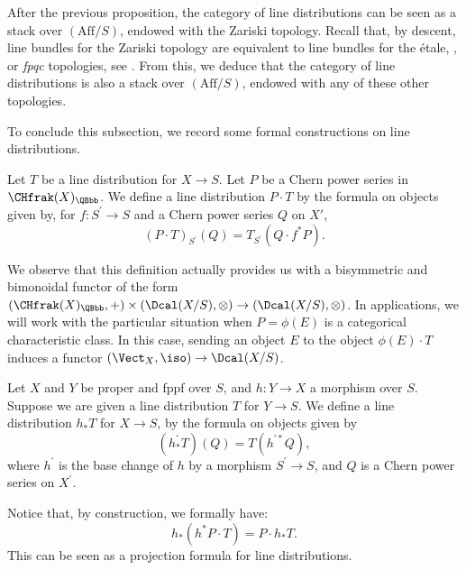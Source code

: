 \begin{remark}
After the previous proposition, the category of line distributions can be seen as a stack over $(\mathrm{Aff}/S)$, endowed with the Zariski topology. Recall that, by descent, line bundles for the Zariski topology are equivalent to line bundles for the étale, \fppf, or \emph{fpqc} topologies, see \cite[\href{https://stacks.math.columbia.edu/tag/03P7}{03P7}]{stacks-project}. From this, we deduce that the category of line distributions is also a stack over $(\mathrm{Aff}/S)$, endowed with any of these other topologies.
\end{remark}

To conclude this subsection, we record some formal constructions on line distributions.
\begin{definition}\label{def:prod-Chern-series-line-distribution}
Let $T$ be a line distribution for $X\to S$. Let $P$ be a Chern power series in $\CHfrak(X)_{\QBbb}$. We define a line distribution $P \cdot T$ by the formula on objects given by, for $f: S^{\prime} \to S$ and a Chern power series $Q$ on $X'$,
\begin{displaymath}
(P \cdot T)_{S^{\prime}}(Q) = T_{S^{\prime}}(Q\cdot f^\ast P).
\end{displaymath}
\end{definition}
We observe that this definition actually provides us with a bisymmetric and bimonoidal functor of the form $(\CHfrak(X)_{\QBbb}, +)\times(\Dcal(X/S),\otimes) \to (\Dcal(X/S),\otimes)$. In appli\-cations, we will work with the particular situation when $P=\phi(E)$ is a categorical characteristic class. In this case, sending an object $E$ to the object $\phi(E)\cdot T$ induces a functor $(\Vect_{X},\iso)\to\Dcal(X/S)$.

\begin{definition}\label{def:direct-image-distributions}
Let $X$ and $Y$ be proper and fppf over $S$, and $h\colon Y\to X$ a morphism over $S$. Suppose we are given a line distribution $T$ for $Y\to S$. We define a line distribution $h_\ast T$ for $X\to S$, by the formula on objects given by
\begin{displaymath}
(h_\ast^{\prime} T)(Q)= T(h^{\prime\ast} Q),
\end{displaymath}
where $h^{\prime}$ is the base change of $h$ by a morphism $S^{\prime}\to S$, and $Q$ is a Chern power series on $X^{\prime}$.
\end{definition}

Notice that, by construction, we formally have:
\begin{equation}\label{linedist:projformula}
h_\ast \left( h^\ast P \cdot T \right) = P \cdot h_\ast T.
\end{equation}
This can be seen as a projection formula for line distributions.

